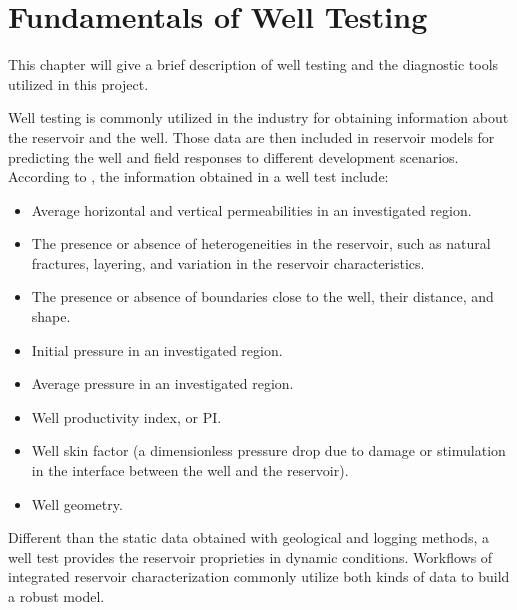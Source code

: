 \chapter{Fundamentals of Well Testing}
\label{chapter-well-testing}

This chapter will give a brief description of well testing and the diagnostic tools utilized in this project.

Well testing is commonly utilized in the industry for obtaining information about the reservoir and the well.
%
Those data are then included in reservoir models for predicting the well and field responses to different development scenarios.
%
According to \cite{Bourdet2002}, the information obtained in a well test include:
%
\begin{itemize}
\item Average horizontal and vertical permeabilities in an investigated region.
\item The presence or absence of heterogeneities in the reservoir, such as natural fractures, layering, and variation in the reservoir characteristics.
\item The presence or absence of boundaries close to the well, their distance, and shape.
\item Initial pressure in an investigated region.
\item Average pressure in an investigated region.
\item Well productivity index, or PI.
\item Well skin factor (a dimensionless pressure drop due to damage or stimulation in the interface between the well and the reservoir).
\item Well geometry.
\end{itemize}
%
Different than the static data obtained with geological and logging methods, a well test provides the reservoir proprieties in dynamic conditions.
%
Workflows of integrated reservoir characterization commonly utilize both kinds of data to build a robust model.

